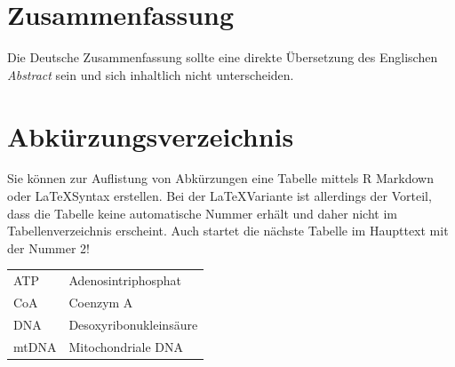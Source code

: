 \documentclass[a4paper,12pt]{article}
\begin{document}
\newpage
\hypertarget{zusammenfassung}{%
\section*{Zusammenfassung}\label{zusammenfassung}}

Die Deutsche Zusammenfassung sollte eine direkte Übersetzung des Englischen \emph{Abstract} sein und sich inhaltlich nicht unterscheiden.

\newpage
\renewcommand{\contentsname}{Inhaltsverzeichnis}
\tableofcontents
\clearpage

\newpage
\hypertarget{abkurzungsverzeichnis}{%
\section*{Abkürzungsverzeichnis}\label{abkurzungsverzeichnis}}

Sie können zur Auflistung von Abkürzungen eine Tabelle mittels R Markdown oder \LaTeX Syntax erstellen. Bei der \LaTeX Variante ist allerdings der Vorteil, dass die Tabelle keine automatische Nummer erhält und daher nicht im Tabellenverzeichnis erscheint. Auch startet die nächste Tabelle im Haupttext mit der Nummer 2!

\vspace{1cm}
\begin{tabular}{*2{l}}
    ATP  &  Adenosintriphosphat   \\ 
    CoA  &  Coenzym A  \\
    DNA  &  Desoxyribonukleinsäure \\         
    mtDNA  &  Mitochondriale DNA \\
\end{tabular}
\newpage
\listoffigures
{}

\newpage
\listoftables
{}
\end{document}
